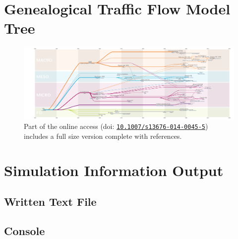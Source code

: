 \newpage
\section{Genealogical Traffic Flow Model Tree}

	\begin{figure}[H]
    		\centering
        		\includegraphics[angle=90,origin=c,trim=0 0 0 0,clip,height=0.9\textwidth]{TFM_timeline.pdf}
		\caption[Genealogical model tree]{Part of the online access \cite{Kessels15} (doi: \href{https://doi.org/10.1007/s13676-014-0045-5}{\texttt{10.1007/s13676-014-0045-5}}) includes a full size version complete with references.}
		\label{fig:supp:tree}
	\end{figure}
	
\newpage
\section{Simulation Information Output}
\lstset{inputpath=textfiles/}
\label{txt:info:output} 

\subsection{Written Text File}
\label{txt:info:file} 
	\lstset{style=txt}
	

\subsection{Console}
\label{txt:info:console} 
	\lstset{style=txt}
	







